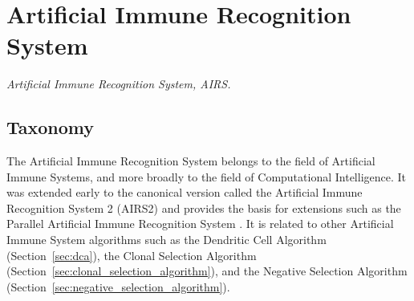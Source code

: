 

\section{Artificial Immune Recognition System} 
\label{sec:airs}

\emph{Artificial Immune Recognition System, AIRS.}

\subsection{Taxonomy}
The Artificial Immune Recognition System belongs to the field of Artificial Immune Systems, and more broadly to the field of Computational Intelligence.
It was extended early to the canonical version called the  Artificial Immune Recognition System 2 (AIRS2) and provides the basis for extensions such as the Parallel Artificial Immune Recognition System \cite{Watkins2004}.
It is related to other Artificial Immune System algorithms such as the Dendritic Cell Algorithm (Section~\ref{sec:dca}), the Clonal Selection Algorithm (Section~\ref{sec:clonal_selection_algorithm}), and the Negative Selection Algorithm (Section~\ref{sec:negative_selection_algorithm}).

